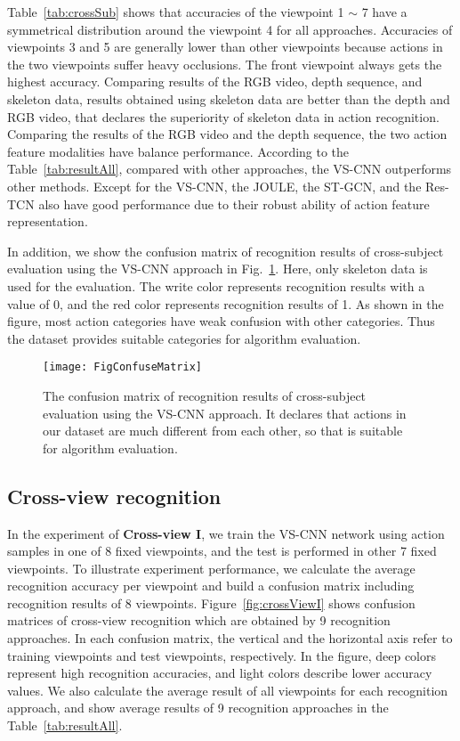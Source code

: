 \documentclass[journal]{IEEEtran}
\begin{document}
Table~\ref{tab:crossSub} shows that accuracies of the viewpoint 1 $\sim$ 7 have a symmetrical distribution around the viewpoint 4 for all approaches. Accuracies of viewpoints 3 and 5 are generally lower than other viewpoints because actions in the two viewpoints suffer heavy occlusions. The front viewpoint always gets the highest accuracy. Comparing results of the RGB video, depth sequence, and skeleton data, results obtained using skeleton data are better than the depth and RGB video, that declares the superiority of skeleton data in action recognition. Comparing the results of the RGB video and the depth sequence, the two action feature modalities have balance performance.
According to the Table~\ref{tab:resultAll}, compared with other approaches, the VS-CNN outperforms other methods. Except for the VS-CNN, the JOULE, the ST-GCN, and the Res-TCN also have good performance due to their robust ability of action feature representation.

In addition, we show the confusion matrix of recognition results of cross-subject evaluation using the VS-CNN approach in Fig.~\ref{fig:confusionMatrix}. Here, only skeleton data is used for the evaluation. The write color represents recognition results with a value of 0, and the red color represents recognition results of 1. As shown in the figure, most action categories have weak confusion with other categories. Thus the dataset provides suitable categories for algorithm evaluation.
\begin{figure}[t]
\begin{center}
\texttt{[image: FigConfuseMatrix]}
\end{center}
   \caption{The confusion matrix of recognition results of cross-subject evaluation using the VS-CNN approach. It declares that actions in our dataset are much different from each other, so that is suitable for algorithm evaluation.}
\label{fig:confusionMatrix}
\end{figure}
\subsection{Cross-view recognition}
In the experiment of \textbf{Cross-view I}, we train the VS-CNN network using action samples in one of 8 fixed viewpoints, and the test is performed in other 7 fixed viewpoints. To illustrate experiment performance, we calculate the average recognition accuracy per viewpoint and build a confusion matrix including recognition results of 8 viewpoints. Figure~\ref{fig:crossViewI} shows confusion matrices of cross-view recognition which are obtained by 9 recognition approaches. In each confusion matrix, the vertical and the horizontal axis refer to training viewpoints and test viewpoints, respectively. In the figure, deep colors represent high recognition accuracies, and light colors describe lower accuracy values. We also calculate the average result of all viewpoints for each recognition approach, and show average results of 9 recognition approaches in the Table~\ref{tab:resultAll}.
\end{document}
